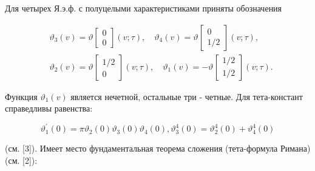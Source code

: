 \documentclass[10pt]{article}
\begin{document}
Для четырех Я.э.ф. с полуцелыми характеристиками приняты обозначения



\[

\begin{aligned}

& \vartheta_{3}(v)=\vartheta\left[\begin{array}{l}

0 \\

0

\end{array}\right](v ; \tau), \quad \vartheta_{4}(v)=\vartheta\left[\begin{array}{c}

0 \\

1 / 2

\end{array}\right](v ; \tau), \\

& \vartheta_{2}(v)=\vartheta\left[\begin{array}{c}

1 / 2 \\

0

\end{array}\right](v ; \tau), \quad \vartheta_{1}(v)=-\vartheta\left[\begin{array}{l}

1 / 2 \\

1 / 2

\end{array}\right](v ; \tau) .

\end{aligned}

\]



Функция $\vartheta_{1}(v)$ является нечетной, остальные три - четные. Для тета-констант справедливы равенства:



\[

\vartheta_{1}^{\prime}(0)=\pi \vartheta_{2}(0) \vartheta_{3}(0) \vartheta_{4}(0), \vartheta_{3}^{4}(0)=\vartheta_{2}^{4}(0)+\vartheta_{4}^{4}(0)

\]



(см. [3]). Имеет место фундаментальная теорема сложения (тета-формула Римана) (см. [2]):
\end{document}
